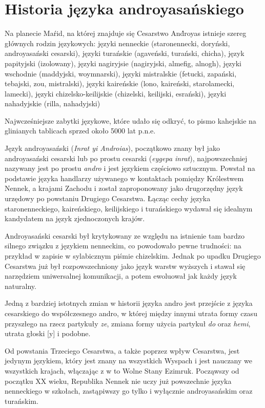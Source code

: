 \section[Historia]{Historia języka androyasańskiego}

Na planecie Maŕid, na której znajduje się Cesarstwo And́royas istnieje szereg 
głównych rodzin językowych: języki nenneckie (staronennecki, doryński, 
androyasański cesarski), języki turańskie (agaveński, turański, chicha), język 
papityjski (izolowany), języki nagiryjsie (nagiryjski, almefig, alnogh), 
języki wschodnie (maddyjski, woymnarski), języki mistralskie (fetucki, zapański, 
tebajski, zou, mistralski), języki kaireńskie (lono, kaireński, starolamecki, 
lamecki), języki chi\-zelsko-keilijskie (chizelski, keilijski, esrański), języki 
nahadyjskie (rilla, nahadyjski)

Najwcześniejsze zabytki językowe, które udało się odkryć, to pismo kahejskie na 
glinianych tablicach sprzed około 5000 lat p.n.e.

Język androyasański (\emph{Inrat yi Androias}), początkowo znany był jako 
androyasański cesarski lub po prostu cesarski (\emph{eygepa inrat}), 
najpowszechniej nazywany jest po prostu \emph{andro} i jest językiem częściowo 
sztucznym. Powstał na podstawie języka handlarzy używanego w kontaktach pomiędzy 
Królestwem Nennek, a krajami Zachodu i został zaproponowany jako drugorzędny 
język urzędowy po powstaniu Drugiego Cesarstwa. Łącząc cechy języka 
staronenneckiego, kaireńskiego, keilijskiego i turańskiego wydawał się idealnym 
kandydatem na język zjednoczonych krajów.

Androyasański cesarski był krytykowany ze względu na istnienie tam bardzo 
silnego związku z językiem nenneckim, co powodowało pewne trudności: na przykład 
w zapisie w sylabicznym piśmie chizelskim. Jednak po upadku Drugiego Cesarstwa 
już był rozpowszechniony jako język warstw wyższych i stawał się narzędziem 
uniwersalnej komunikacji, a potem ewoluował jak każdy język naturalny.

Jedną z bardziej istotnych zmian w historii języka andro jest przejście z języka
cesarskiego do współczesnego andro, w której między innymi utrata formy czasu
przyszłego na rzecz partykuły \emph{ze}, zmiana formy użycia partykuł \emph{do}
oraz \emph{hemi}, utrata głoski [y] i podobne.

Od powstania Trzeciego Cesarstwa, a także poprzez wpływ Cesarstwa, jest jedynym 
językiem, który jest znany na wszystkich Wyspach i jest nauczany we wszystkich 
krajach, włączając z w to Wolne Stany Ezimruk. Począwszy od początku XX wieku, 
Republika Nennek nie uczy już powszechnie języka nenneckiego w szkołach, 
zastąpiwszy go tylko i wyłącznie androyasańskim oraz turańskim.

